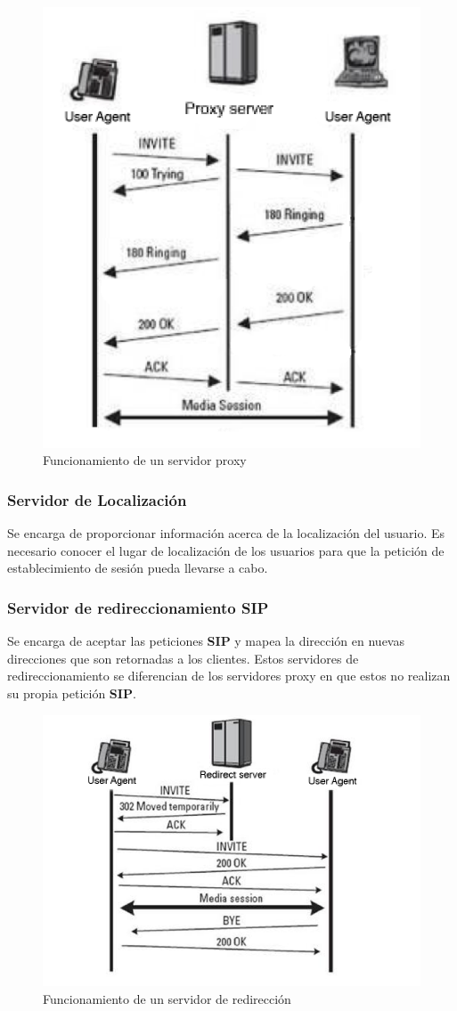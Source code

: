 \documentclass[a4paper, 11pt]{article} %
\begin{document}
		\begin{figure}[tbph]
			\centering
			\includegraphics[width=0.7\linewidth]{./Sproxy}\\
			Funcionamiento de un servidor proxy
			\label{fig:Sproxy}
		\end{figure}
		
		\subsubsection{Servidor de Localización}
			Se encarga de proporcionar información acerca de la localización del usuario. Es necesario conocer el lugar de localización de los usuarios para que la petición de establecimiento de sesión pueda llevarse a cabo.
		
		\subsubsection{Servidor de redireccionamiento SIP}
			Se encarga de aceptar las peticiones \textbf{SIP} y mapea la dirección en nuevas direcciones que son retornadas a los clientes. Estos servidores de redireccionamiento se diferencian  de los servidores proxy en que estos no realizan su propia petición \textbf{SIP}.
		
		\begin{figure}[tbph]
			\centering
			\includegraphics[width=0.7\linewidth]{./Sredirect}\\
			Funcionamiento de un servidor de redirección
			\label{fig:Sredir}
		\end{figure}
	
\end{document}
